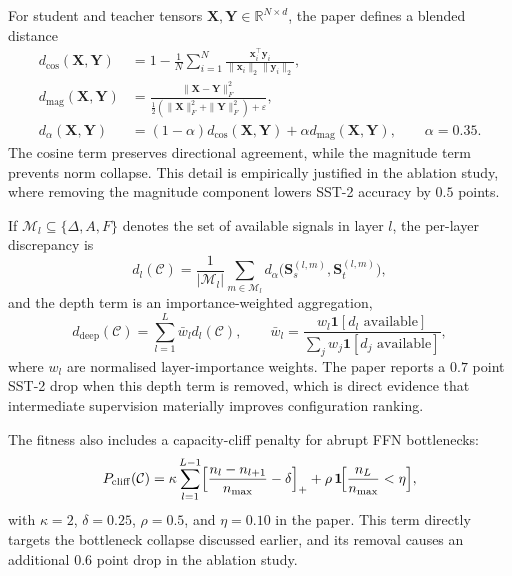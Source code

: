 For student and teacher tensors $\mathbf{X},\mathbf{Y}\in\mathbb{R}^{N\times d}$, the paper defines a blended distance
\begin{align}
  d_{\mathrm{cos}}(\mathbf{X},\mathbf{Y})
  &=
  1-\frac{1}{N}\sum_{i=1}^{N}
  \frac{\mathbf{x}_i^\top \mathbf{y}_i}{\|\mathbf{x}_i\|_2\|\mathbf{y}_i\|_2},
  \label{eq:design_dcos} \\
  d_{\mathrm{mag}}(\mathbf{X},\mathbf{Y})
  &=
  \frac{\|\mathbf{X}-\mathbf{Y}\|_F^2}
       {\tfrac12(\|\mathbf{X}\|_F^2+\|\mathbf{Y}\|_F^2)+\varepsilon},
  \label{eq:design_dmag} \\
  d_{\alpha}(\mathbf{X},\mathbf{Y})
  &=
  (1-\alpha)d_{\mathrm{cos}}(\mathbf{X},\mathbf{Y})
  + \alpha d_{\mathrm{mag}}(\mathbf{X},\mathbf{Y}),
  \qquad \alpha=0.35.
  \label{eq:design_dalpha}
\end{align}
The cosine term preserves directional agreement, while the magnitude term prevents norm collapse. This detail is empirically justified in the ablation study, where removing the magnitude component lowers SST-2 accuracy by $0.5$ points.

If $\mathcal{M}_l\subseteq\{\Delta,A,F\}$ denotes the set of available signals in layer $l$, the per-layer discrepancy is
\begin{equation}
  d_l(\mathcal{C})
  =
  \frac{1}{|\mathcal{M}_l|}
  \sum_{m\in\mathcal{M}_l}
  d_{\alpha}\!\bigl(\mathbf{S}^{(l,m)}_s,\mathbf{S}^{(l,m)}_t\bigr),
  \label{eq:design_dl}
\end{equation}
and the depth term is an importance-weighted aggregation,
\begin{equation}
  d_{\mathrm{deep}}(\mathcal{C})
  =
  \sum_{l=1}^{L}\bar{w}_l d_l(\mathcal{C}),
  \qquad
  \bar{w}_l
  =
  \frac{w_l \mathbf{1}[d_l \text{ available}]}
       {\sum_j w_j \mathbf{1}[d_j \text{ available}]},
  \label{eq:design_ddeep}
\end{equation}
where $w_l$ are normalised layer-importance weights. The paper reports a $0.7$ point SST-2 drop when this depth term is removed, which is direct evidence that intermediate supervision materially improves configuration ranking.

The fitness also includes a capacity-cliff penalty for abrupt FFN bottlenecks:
\begin{equation}
  P_{\mathrm{cliff}}(\mathcal{C})
  =
  \kappa\sum_{l=1}^{L-1}
  \Bigl[
    \frac{n_l-n_{l+1}}{n_{\max}}-\delta
  \Bigr]_+
  +
  \rho\,\mathbf{1}\!\Bigl[\frac{n_L}{n_{\max}}<\eta\Bigr],
  \label{eq:design_cliff}
\end{equation}
with $\kappa=2$, $\delta=0.25$, $\rho=0.5$, and $\eta=0.10$ in the paper. This term directly targets the bottleneck collapse discussed earlier, and its removal causes an additional $0.6$ point drop in the ablation study.

